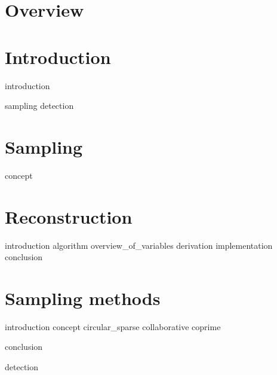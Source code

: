 \documentclass[a4paper, openany, oneside]{memoir}
\begin{document}
\chapter{Overview}

\chapter{Introduction}
{introduction}

{sampling}
{detection}


\chapter{Sampling}
\label{cha:sampling}

{concept}

\chapter{Reconstruction}
\label{cha:reconstruction}

{introduction}
{algorithm}
{overview_of_variables}
{derivation}
{implementation}
{conclusion}

\chapter{Sampling methods}
\label{cha:sampling_methods}

{introduction}
{concept}
{circular_sparse}
{collaborative}
{coprime}

{conclusion}


{detection}
\end{document}
